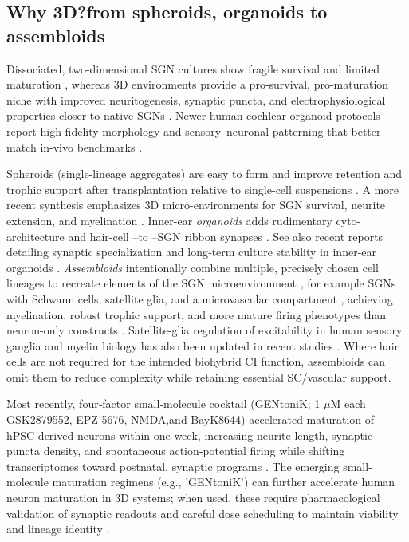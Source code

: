 \documentclass[referee,pdflatex, sn-vancouver-num]{sn-jnl}%
\theoremstyle{thmstyleone}%
\theoremstyle{thmstyletwo}%
\theoremstyle{thmstylethree}%
\DeclareRobustCommand{\textendash}{\ifmmode\text{-}\else\leavevmode\hbox{--}\fi}
\begin{document}
\subsection{Why 3D?\textemdash from spheroids, organoids to assembloids}
Dissociated, two-dimensional SGN cultures show fragile survival and limited maturation \cite{Corrales2006}, whereas 3D environments provide a pro-survival, pro-maturation niche with improved neuritogenesis, synaptic puncta, and electrophysiological properties closer to native SGNs \cite{Zine2021StemCells,Sun2023CellProlif, koehler2013, Koehler2013Nature, koehler2017}. Newer human cochlear organoid protocols report high-fidelity morphology and sensory–neuronal patterning that better match in-vivo benchmarks \cite{Moore2025_CellStemCell}.

Spheroids (single-lineage aggregates) are easy to form and improve retention and trophic support after transplantation relative to single-cell suspensions \cite{Chang2020ActaBiomaterialia}. A more recent synthesis emphasizes 3D micro-environments for SGN survival, neurite extension, and myelination \cite{Zhang2024_NRR}. Inner-ear \emph{organoids} adds rudimentary cyto-architecture and hair-cell \textendash to \textendash SGN ribbon synapses \cite{Koehler2013Nature,koehler2017,Sun2023CellProlif}. 
See also recent reports detailing synaptic specialization and long‑term culture stability in inner‑ear organoids \cite{Moore2025_CellStemCell}. \emph{Assembloids} intentionally combine multiple, precisely chosen cell lineages to recreate elements of the SGN microenvironment \textemdash, for example SGNs with Schwann cells, satellite glia, and a microvascular compartment \textemdash, achieving myelination, robust trophic support, and more mature firing phenotypes than neuron-only constructs \cite{Xia2023StemCellReports,Oliveira2023FrontiersPN}. Satellite‑glia regulation of excitability in human sensory ganglia and myelin biology has also been updated in recent studies \cite{LeBlang2024_bioRxiv}. Where hair cells are not required for the intended biohybrid CI function, assembloids can omit them to reduce complexity while retaining essential SC/vascular support.

Most recently, four‑factor small‑molecule cocktail (GENtoniK; 1 $\mu$M each GSK2879552, EPZ‑5676, NMDA,and BayK8644) accelerated maturation of hPSC‑derived neurons within one week, increasing neurite length, synaptic puncta density, and spontaneous action‑potential firing while shifting transcriptomes toward postnatal, synaptic programs \cite{Hergenreder:2024aa}. The emerging small-molecule maturation regimens (e.g., 'GENtoniK') can further accelerate human neuron maturation in 3D systems; when used, these require pharmacological validation of synaptic readouts and careful dose scheduling to maintain viability and lineage identity \citep{Hergenreder2024NatBiotech}.
\end{document}
